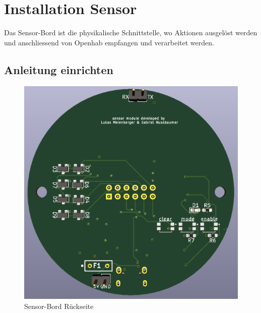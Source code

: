 \clearpage
\section{Installation Sensor}\label{sec:Sensor}

Das Sensor-Bord ist die physikalische Schnittstelle, wo Aktionen ausgelöst werden und anschliessend von Openhab empfangen und verarbeitet werden.
\subsection{Anleitung einrichten}
\begin{figure}[H]
	\begin{center}
		\begin{minipage}[b]{.3\linewidth} %
			\includegraphics[width=\textwidth]{graphics/Sensor1.PNG}
			\caption{Sensor-Bord Rückseite}
			\label{pic: Sensorbord}
		\end{minipage}
		\hspace{.1\linewidth}%
		\begin{minipage}[b]{.3\linewidth} %

\end{minipage}
\end{center}
\end{figure}
